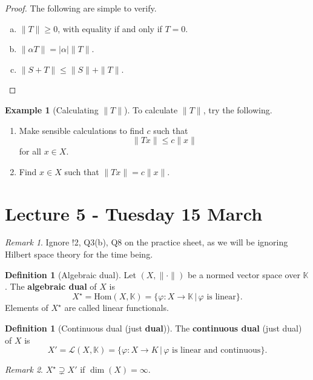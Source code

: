 \documentclass[10pt, oneside, reqno]{amsart}
\theoremstyle{plain}%
\theoremstyle{definition}
\newtheorem{defn}[thm]{Definition}
\newtheorem{exmp}[thm]{Example}
\theoremstyle{remark}
\newtheorem*{rem}{Remark}
\newcommand{\K}{\mathbb{K}}
\renewcommand{\phi}{\varphi}
\begin{document}
\begin{proof}  The following are simple to verify.
	\begin{enumerate}[(a)]
		\item $\| T \| \geq 0$, with equality if and only if $ T = 0$. 
		\item $\| \alpha T \| = | \alpha | \|T \|$.
		\item $\| S + T \| \leq  \| S \| + \| T \|$.
	\end{enumerate}
\end{proof}

\begin{exmp}[Calculating $\| T \|$]
	To calculate $\| T \|$, try the following. 
	\begin{enumerate}[1)]
		\item Make sensible calculations to find $c$ such that \[
			\| Tx \| \leq c \| x \|
		\] for all $x \in X$.
		\item Find $x \in X$ such that $\|Tx \| = c \| x \|$.
	\end{enumerate}
\end{exmp}

\section{Lecture 5 - Tuesday 15 March} %
\label{sec:lecture_5_tusday_15_march}
\begin{rem}
	Ignore !2, Q3(b), Q8 on the practice sheet, as we will be ignoring Hilbert space theory for the time being.
\end{rem}

\begin{defn}[Algebraic dual]
	Let $(X, \| \cdot \|)$ be a normed vector space over $\K$.  The \textbf{algebraic dual} of $X$ is \[
		X^\star = \text{Hom}(X, \K) = \{ \phi: X \rightarrow \K \, | \, \text{$\phi$ is linear} \}.
	\]  Elements of $X^\star$ are called linear functionals.
\end{defn}

\begin{defn}[Continuous dual (just \textbf{dual})]
	The \textbf{continuous dual} (just dual) of $X$ is \[
		X' = \mathcal{L}(X, \K) = \{ \phi : X \rightarrow K \, | \, \text{$\phi$ is linear and continuous} \}.
	\]
\end{defn}

\begin{rem}
	$X^\star \supsetneq X'$ if $\dim(X) = \infty$.
\end{rem}
\end{document}
